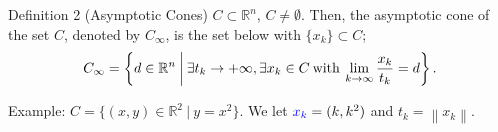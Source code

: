 \documentclass[aspectratio=169, dvipdfmx, 11pt]{beamer} %
\begin{document}
\begin{frame}{}
    \begin{block}{Definition 2
        (Asymptotic Cones)}
        $C \subset \mathbb{R}^n$, $C \neq \emptyset$. Then, the asymptotic cone of the set $C$, denoted by $C_\infty$, is the set below with $\{ x_k \} \subset C$;
        \begin{equation}
        C_\infty = \left\{ d \in
        \mathbb{R}^n \:\middle|\: \exists t_k \rightarrow +\infty, \exists x_k \in C \:\text{with}\: \lim_{k \to \infty} \frac{x_k}{t_k} = d \right\}. \notag
        \end{equation}
    \end{block}

    Example: $C = \{(x,y) \in \mathbb{R}^2 \:|\: y=x^2\}$. We let $\textcolor{blue}{x_k} = (k, k^2)$ and $t_k = \left\lVert x_k \right\rVert$.


\end{frame}
\end{document}
